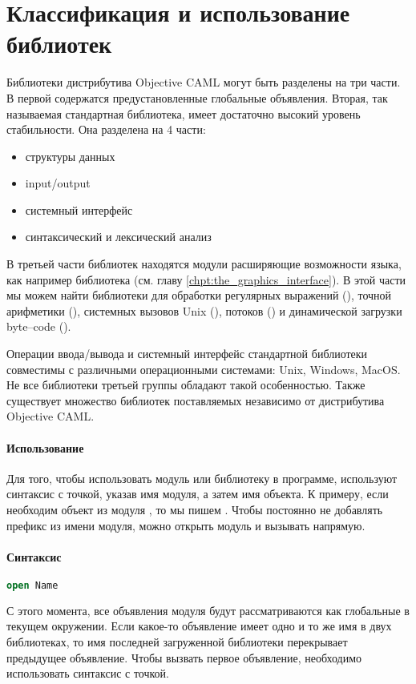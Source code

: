 \section {Классификация и использование библиотек}
\label{sec:categorization_and_use_of_the_libraries}

Библиотеки дистрибутива Objective CAML могут быть разделены на три части. В 
первой содержатся предустановленные глобальные объявления. Вторая, так 
называемая стандартная библиотека, имеет достаточно высокий уровень 
стабильности. Она разделена на 4 части:

\begin{itemize}
	\item структуры данных

	\item input/output

	\item системный интерфейс

	\item синтаксический и лексический анализ 
\end{itemize}

В третьей части библиотек находятся модули расширяющие возможности языка, как 
например библиотека  (см. главу 
\ref{chpt:the_graphics_interface}). В этой части мы можем найти библиотеки для 
обработки регулярных выражений (), точной арифметики (), 
системных вызовов Unix (), потоков () и динамической 
загрузки byte--code ().

Операции ввода/вывода и системный интерфейс стандартной библиотеки совместимы с 
различными операционными системами: Unix, Windows, MacOS. Не все библиотеки 
третьей группы обладают такой особенностью. Также существует множество библиотек 
поставляемых независимо от дистрибутива Objective CAML.

\paragraph{Использование}

Для того, чтобы использовать модуль или библиотеку в программе, используют 
синтаксис с точкой, указав имя модуля, а затем имя объекта. К примеру, если 
необходим объект  из модуля , то мы пишем . 
Чтобы постоянно не добавлять префикс из имени модуля, можно открыть модуль и 
вызывать  напрямую.

\paragraph{Синтаксис}

\begin{lstlisting}[language=OCaml]
open Name
\end{lstlisting}

С этого момента, все объявления модуля  будут рассматриваются как 
глобальные в текущем окружении. Если какое-то объявление имеет одно и то же имя 
в двух библиотеках, то имя последней загруженной библиотеки перекрывает 
предыдущее объявление. Чтобы вызвать первое объявление, необходимо использовать 
синтаксис с точкой.